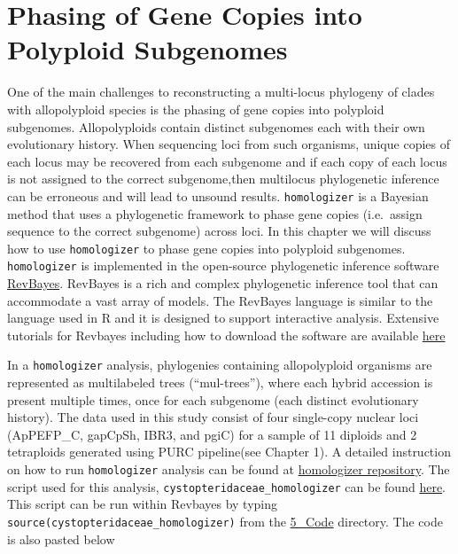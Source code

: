 \documentclass[
]{book}
\begin{document}
\hypertarget{phasing-design}{%
\chapter{Phasing of Gene Copies into Polyploid Subgenomes}\label{phasing-design}}

One of the main challenges to reconstructing a multi-locus phylogeny of clades with allopolyploid species is the phasing of gene copies into polyploid subgenomes. Allopolyploids contain distinct subgenomes each with their own evolutionary
history. When sequencing loci from such organisms, unique copies of each locus may be recovered from each subgenome and if each copy of each locus is not assigned to the correct subgenome,then multilocus phylogenetic inference can be erroneous and will lead to unsound results. \texttt{homologizer} is a Bayesian method that uses a phylogenetic framework to phase gene copies (i.e.~assign sequence to the correct subgenome) across loci. In this chapter we will discuss how to use \texttt{homologizer} to phase gene copies into polyploid subgenomes. \texttt{homologizer} is implemented in the open-source phylogenetic inference software \href{http://revbayes.com}{RevBayes}. RevBayes is a rich and complex phylogenetic inference tool that can accommodate a vast array of models. The RevBayes language is similar to the language used in R and it is designed to support interactive analysis. Extensive tutorials for Revbayes including how to download the software are available \href{http://revbayes.com}{here}

In a \texttt{homologizer} analysis, phylogenies containing allopolyploid organisms are represented as multilabeled trees (``mul-trees''), where each hybrid accession is present multiple times, once for each subgenome (each distinct evolutionary history).
The data used in this study consist of four single-copy nuclear loci (ApPEFP\_C, gapCpSh, IBR3, and pgiC) for a sample of 11 diploids and 2 tetraploids generated using PURC pipeline(see Chapter 1). A detailed instruction on how to run \texttt{homologizer} analysis can be found at \href{http://github.com/wf8/homologizer}{homologizer repository}. The script used for this analysis, \texttt{cystopteridaceae\_homologizer} can be found \href{https://github.com/Chinedum335/Semester_Project/tree/main/5_Code}{here}. This script can be run within Revbayes by typing \texttt{source(cystopteridaceae\_homologizer)} from the \href{https://github.com/Chinedum335/Semester_Project/tree/main/5_Code}{5\_Code} directory. The code is also pasted below
\end{document}
